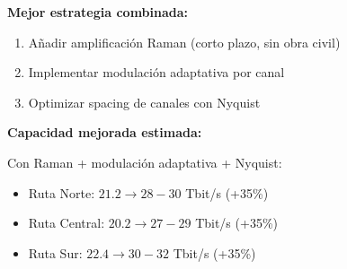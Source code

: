 \documentclass[12pt,a4paper]{extarticle}
\begin{document}
\textbf{Mejor estrategia combinada:}

\begin{enumerate}
    \item Añadir amplificación Raman (corto plazo, sin obra civil)
    \item Implementar modulación adaptativa por canal
    \item Optimizar spacing de canales con Nyquist
\end{enumerate}

\textbf{Capacidad mejorada estimada:}

Con Raman + modulación adaptativa + Nyquist:
\begin{itemize}
    \item Ruta Norte: $21.2 \rightarrow 28-30$ Tbit/s (+35\%)
    \item Ruta Central: $20.2 \rightarrow 27-29$ Tbit/s (+35\%)
    \item Ruta Sur: $22.4 \rightarrow 30-32$ Tbit/s (+35\%)
\end{itemize}
\end{document}
